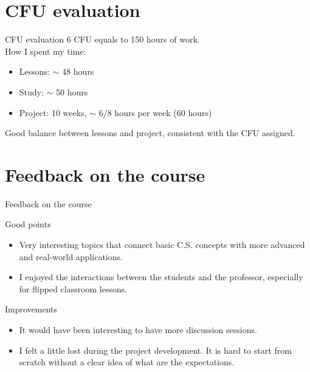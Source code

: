 \documentclass{beamer}
\begin{document}
\section{CFU evaluation}
\begin{frame}{CFU evaluation}
	6 CFU equals to 150 hours of work.
	\\
	How I spent my time:
	\begin{itemize}
		\item Lessons: $\sim$ 48 hours
		\item Study: $\sim$ 50 hours
		\item Project: 10 weeks, $\sim$ 6/8 hours per week (60 hours)
	\end{itemize}
	\begin{block}{}
		Good balance between lessons and project, consistent with the CFU assigned.
	\end{block}
\end{frame}

\section{Feedback on the course}
\begin{frame}{Feedback on the course}
	\begin{block}{Good points}
		\begin{itemize}
			\item Very interesting topics that connect basic C.S. concepts with more advanced and real-world applications.
			\item I enjoyed the interactions between the students and the professor, especially for flipped classroom lessons.
		\end{itemize}
	\end{block}
	\begin{block}{Improvements}
		\begin{itemize}
			\item It would have been interesting to have more discussion sessions.
			\item I felt a little lost during the project development. It is hard to start from scratch without a clear idea of what are the expectations.
		\end{itemize}
	\end{block}
\end{frame}
\end{document}
